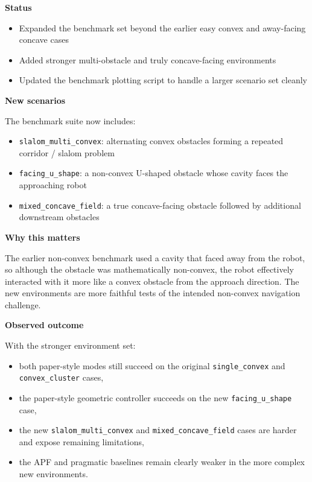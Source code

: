 \documentclass[11pt]{article}
\begin{document}
\textbf{Status}

\begin{itemize}[leftmargin=*]
  \item Expanded the benchmark set beyond the earlier easy convex and away-facing concave cases
  \item Added stronger multi-obstacle and truly concave-facing environments
  \item Updated the benchmark plotting script to handle a larger scenario set cleanly
\end{itemize}

\textbf{New scenarios}

The benchmark suite now includes:

\begin{itemize}[leftmargin=*]
  \item \texttt{slalom\_multi\_convex}: alternating convex obstacles forming a repeated corridor / slalom problem
  \item \texttt{facing\_u\_shape}: a non-convex U-shaped obstacle whose cavity faces the approaching robot
  \item \texttt{mixed\_concave\_field}: a true concave-facing obstacle followed by additional downstream obstacles
\end{itemize}

\textbf{Why this matters}

The earlier non-convex benchmark used a cavity that faced away from the robot,
so although the obstacle was mathematically non-convex, the robot effectively
interacted with it more like a convex obstacle from the approach direction.
The new environments are more faithful tests of the intended non-convex
navigation challenge.

\textbf{Observed outcome}

With the stronger environment set:

\begin{itemize}[leftmargin=*]
  \item both paper-style modes still succeed on the original \texttt{single\_convex} and \texttt{convex\_cluster} cases,
  \item the paper-style geometric controller succeeds on the new \texttt{facing\_u\_shape} case,
  \item the new \texttt{slalom\_multi\_convex} and \texttt{mixed\_concave\_field} cases are harder and expose remaining limitations,
  \item the APF and pragmatic baselines remain clearly weaker in the more complex new environments.
\end{itemize}
\end{document}
